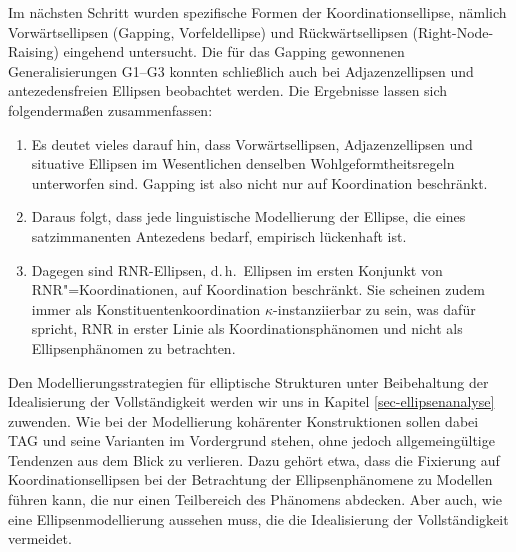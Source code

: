 Im nächsten Schritt wurden spezifische Formen der Koordinationsellipse, nämlich Vorwärtsellipsen (Gapping, Vorfeldellipse) und Rückwärtsellipsen (Right-Node-Raising) eingehend untersucht. Die für das Gapping gewonnenen Generalisierungen G1--G3 konnten schlie\ss lich auch bei Adjazenzellipsen und antezedensfreien Ellipsen beobachtet werden. Die Ergebnisse lassen sich folgendermaßen zusammenfassen:

\begin{enumerate}
	\item  Es deutet vieles darauf hin, dass Vorwärtsellipsen, Adjazenzellipsen und situative Ellipsen im Wesentlichen denselben Wohlgeformtheitsregeln unterworfen sind. Gapping ist also nicht nur auf Koordination beschränkt.
  \item Daraus folgt, dass jede linguistische Modellierung der Ellipse, die eines satzimmanenten Antezedens bedarf, empirisch lückenhaft ist. 
  \item Dagegen sind RNR-Ellipsen, d.\,h.\ Ellipsen im ersten Konjunkt von RNR"=Koordinationen, auf Koordination beschränkt. Sie scheinen zudem immer als Konstituentenkoordination $\kappa$-instanziierbar zu sein, was dafür spricht, RNR in erster Linie als Koordinationsphänomen und nicht als Ellipsenphänomen zu betrachten.

\end{enumerate}

Den Modellierungsstrategien für elliptische Strukturen unter Beibehaltung der Idealisierung der Vollständigkeit werden wir uns in Kapitel \ref{sec-ellipsenanalyse} zuwenden. Wie bei der Modellierung kohärenter Konstruktionen sollen dabei TAG und seine Varianten im Vordergrund stehen, ohne jedoch allgemeingültige Tendenzen aus dem Blick zu verlieren. Dazu gehört etwa, dass die Fixierung auf Koordinationsellipsen bei der Betrachtung der Ellipsenphänomene zu Modellen führen kann, die nur einen Teilbereich des Phänomens abdecken. Aber auch, wie eine Ellipsenmodellierung aussehen muss, die die Idealisierung der Vollständigkeit vermeidet.

 











